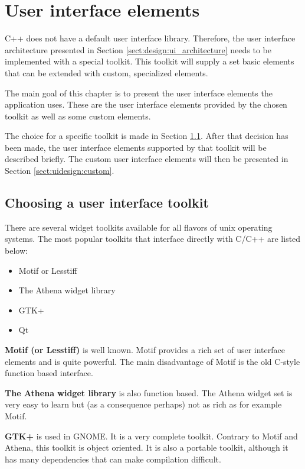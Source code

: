 
\chapter{User interface elements} \label{chap:uidesign}
C++ does not have a default user interface library. Therefore, the user
interface architecture presented in Section \ref{sect:design:ui_architecture}
needs to be implemented with a special toolkit. This toolkit will supply a set
basic elements that can be extended with custom, specialized elements.

\bigskip \noindent
The main goal of this chapter is to present the user interface elements the
application uses. These are the user interface elements provided by the chosen
toolkit as well as some custom elements.

\bigskip \noindent
The choice for a specific toolkit is made in Section
\ref{sect:uidesign:toolkit}. After that decision has been made, the user
interface elements supported by that toolkit will be described briefly. The
custom user interface elements will then be presented in Section
\ref{sect:uidesign:custom}.

\section{Choosing a user interface toolkit} \label{sect:uidesign:toolkit}
There are several widget toolkits available for all flavors of unix operating
systems. The most popular toolkits that interface directly with C/C++ are
listed below:
\begin{itemize}
\item Motif or Lesstiff
\item The Athena widget library
\item GTK+
\item Qt
\end{itemize}

\bigskip \noindent
\textbf{Motif (or Lesstiff)} is well known. Motif provides a rich set of user
interface elements and is quite powerful. The main disadvantage of Motif is the
old C-style function based interface.


\bigskip \noindent
\textbf{The Athena widget library} is also function based. The Athena widget
set is very easy to learn but (as a consequence perhaps) not as rich as for
example Motif.

\bigskip \noindent
\textbf{GTK+} is used in GNOME. It is a very complete toolkit. Contrary to
Motif and Athena, this toolkit is object oriented. It is also a portable
toolkit, although it has many dependencies that can make compilation difficult.

